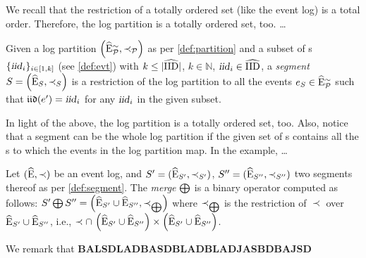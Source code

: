 \begin{newj}
We recall that the restriction of a totally ordered set (like the event log) is a total order. Therefore, the log partition is a totally ordered set, too.   \ldots{}

\begin{definition}[Segment]\label{def:segment}
	Given a log partition $\left( \widehat{\mathrm{E}}^{\sim}_{\mathcal{P}}, \prec_{\mathcal{P}} \right)$ as per \cref{def:partition} and a subset of {\CId}s $\{\textrm{\textsl{iid}}_i\}_{i \in [1,k]}$ (see \cref{def:evt}) with $k \leq |\widehat{\mathrm{IID}}|$, $k \in \mathbb{N}$, $\textrm{\textsl{iid}}_i \in \widehat{\mathrm{IID}}$, a \emph{segment} $S = \left( \widehat{\mathrm{E}}_{S}, \prec_{S} \right)$ is a restriction of the log partition to all the events $e_{S} \in \widehat{\mathrm{E}}^{\sim}_{\mathcal{P}}$ such that $\mathfrak{iid}(e') = \textrm{\textsl{iid}}_i$ for any $\textrm{\textsl{iid}}_i$ in the given subset. 
\end{definition}
%
In light of the above, the log partition is a totally ordered set, too. Also, notice that a segment can be the whole log partition if the given set of {\CId}s contains all the {\CId}s to which the events in the log partition map. In the example, \ldots{}


\begin{definition}[Merge]\label{def:merge}
	Let $(\widehat{\mathrm{E}}, \prec)$ be an event log, and
	${S' = (\widehat{\mathrm{E}}_{S'}, \prec_{S'})}$,
	${S'' = (\widehat{\mathrm{E}}_{S''}, \prec_{S''})}$ two segments thereof as per \cref{def:segment}. 
	The \emph{merge} $\bigoplus$ is a binary operator computed as follows: 
	$S' \bigoplus S'' = \left(\widehat{\mathrm{E}}_{S'} \cup \widehat{\mathrm{E}}_{S''}, \prec_{\bigoplus} \right)$ 
	where 
	$\prec_{\bigoplus}$ is the restriction of $\prec$ over $\widehat{\mathrm{E}}_{S'} \cup \widehat{\mathrm{E}}_{S''}$, i.e.,  $\prec \cap\, \left(\widehat{\mathrm{E}}_{S'} \cup \widehat{\mathrm{E}}_{S''}\right) \times \left(\widehat{\mathrm{E}}_{S'} \cup \widehat{\mathrm{E}}_{S''}\right)$. 
\end{definition}
%
We remark that \textbf{BALSDLADBASDBLADBLADJASBDBAJSD}


\begin{comment}
def iid(event):
  bla bla bla
  
caseid = iid
hospitalcaseid = iid
treatmentid = iid

comesichiama = {"hospital" : "caseid", "pharma" : "hospitalcaseid", "clinic" : "treatmentid"}


\end{comment}
\end{newj}
